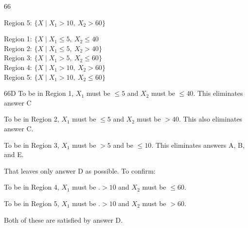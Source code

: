 \begin{question}{66}
\begin{choices}
      Region 5: $\{X \mid X_1 > 10,\ X_2 > 60\}$
\item %
      Region 1: $\{X \mid X_1 \leqslant 5,\ X_2 \leqslant 40$ \\
      Region 2: $\{X \mid X_1 \leqslant 5,\ X_2 > 40\}$ \\
      Region 3: $\{X \mid X_1 > 5,\ X_2 \leqslant 60\}$ \\
      Region 4: $\{X \mid X_1 > 10,\ X_2 > 60\}$ \\
      Region 5: $\{X \mid X_1 > 10,\ X_2 \leqslant 60\}$
\end{choices}
\end{question}
\begin{solution}{66}{D}
To be in Region 1, $X_1$ must be $\leqslant 5$ and $X_2$ must be $\leqslant 40$. This eliminates answer C

To be in Region 2, $X_1$ must be $\leqslant 5$ and $X_2$ must be $> 40$. This also eliminates answer C.

To be in Region 3, $X_1$ must be $> 5$ and be $\leqslant 10$. This eliminates answers A, B, and E.

That leaves only answer D as possible. To confirm:

To be in Region 4, $X_1$ must be .$> 10$ and $X_2$ must be $\leqslant 60$.

To be in Region 5, $X_1$ must be .$> 10$ and $X_2$ must be $> 60$.

Both of these are satisfied by answer D.
\end{solution}

